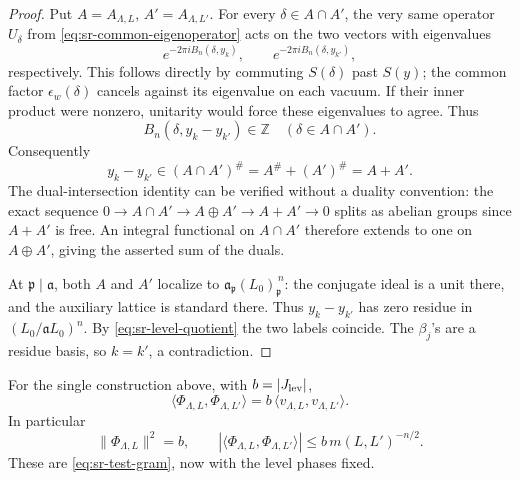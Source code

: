 \begin{proof}
Put \(A=A_{\Lambda,L}\), \(A'=A_{\Lambda,L'}\).
For every \(\delta\in A\cap A'\), the very same operator
\(U_\delta\) from \eqref{eq:sr-common-eigenoperator} acts on the
two vectors with eigenvalues
\[
 e^{-2\pi iB_n(\delta,y_k)},\qquad
 e^{-2\pi iB_n(\delta,y_{k'})},
\]
respectively.  This follows directly by commuting \(S(\delta)\)
past \(S(y)\); the common factor \(\epsilon_w(\delta)\)
cancels against its eigenvalue on each vacuum.
If their inner product were nonzero, unitarity would force
these eigenvalues to agree.  Thus
\[
 B_n(\delta,y_k-y_{k'})\in\mathbb Z
                           \quad(\delta\in A\cap A').
\]
Consequently
\[
 y_k-y_{k'}\in(A\cap A')^\#=A^\#+(A')^\#=A+A'.
\]
The dual-intersection identity can be verified without a
duality convention: the exact sequence
\(0\to A\cap A'\to A\oplus A'\to A+A'\to0\)
splits as abelian groups since \(A+A'\) is free.
An integral functional on \(A\cap A'\) therefore extends to
one on \(A\oplus A'\), giving the asserted sum of the duals.

At \(\mathfrak p\mid\mathfrak a\), both \(A\) and \(A'\)
localize to
\(\mathfrak a_{\mathfrak p}(L_0)_{\mathfrak p}^{\,n}\):
the conjugate ideal is a unit there, and the auxiliary lattice
is standard there.
Thus \(y_k-y_{k'}\) has zero residue in
\((L_0/\mathfrak aL_0)^n\).
By \eqref{eq:sr-level-quotient} the two labels coincide.
The \(\beta_j\)'s are a residue basis, so \(k=k'\), a
contradiction.
\end{proof}

\begin{srproposition}
\label{prop:sr-exact-level-gram}
For the single construction above, with
\(b=|J_{\rm lev}|\),
\[
 \langle\Phi_{\Lambda,L},\Phi_{\Lambda,L'}\rangle
         =b\,\langle v_{\Lambda,L},v_{\Lambda,L'}\rangle.
\]
In particular
\[
 \|\Phi_{\Lambda,L}\|^2=b,\qquad
 |\langle\Phi_{\Lambda,L},\Phi_{\Lambda,L'}\rangle|
      \le b\,m(L,L')^{-n/2}.
\]
These are \eqref{eq:sr-test-gram}, now with the level phases fixed.
\end{srproposition}

